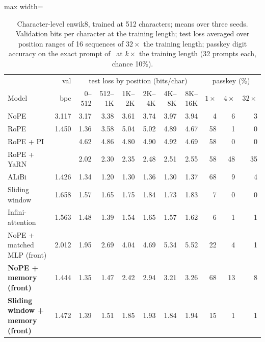 \begin{table}\centering\small
\setlength{\tabcolsep}{3.5pt}
\begin{adjustbox}{max width=\linewidth}
\begin{tabular}{l r rrrrrr rrr}
\toprule
 & val & \multicolumn{6}{c}{test loss by position (bits/char)} & \multicolumn{3}{c}{passkey (\%)} \\
Model & bpc & 0--512 & 512--1K & 1K--2K & 2K--4K & 4K--8K & 8K--16K & $1\times$ & $4\times$ & $32\times$ \\
\midrule
NoPE & 3.117 & 3.17 & 3.38 & 3.61 & 3.74 & 3.97 & 3.94 & 4 & 6 & 3 \\
RoPE & 1.450 & 1.36 & 3.58 & 5.04 & 5.02 & 4.89 & 4.67 & 58 & 1 & 0 \\
RoPE + PI &  & 4.62 & 4.86 & 4.80 & 4.90 & 4.92 & 4.69 & 58 & 0 & 0 \\
RoPE + YaRN &  & 2.02 & 2.30 & 2.35 & 2.48 & 2.51 & 2.55 & 58 & 48 & 35 \\
ALiBi & 1.426 & 1.34 & 1.20 & 1.30 & 1.36 & 1.30 & 1.37 & 68 & 9 & 4 \\
Sliding window & 1.658 & 1.57 & 1.65 & 1.75 & 1.84 & 1.73 & 1.83 & 7 & 0 & 0 \\
Infini-attention & 1.563 & 1.48 & 1.39 & 1.54 & 1.65 & 1.57 & 1.62 & 6 & 1 & 1 \\
NoPE + matched MLP (front) & 2.012 & 1.95 & 2.69 & 4.04 & 4.69 & 5.34 & 5.52 & 22 & 4 & 1 \\
\textbf{NoPE + memory (front)} & 1.444 & 1.35 & 1.47 & 2.42 & 2.94 & 3.21 & 3.26 & 68 & 13 & 8 \\
\textbf{Sliding window + memory (front)} & 1.472 & 1.39 & 1.51 & 1.85 & 1.93 & 1.84 & 1.94 & 15 & 1 & 1 \\
\bottomrule
\end{tabular}
\end{adjustbox}
\caption{Character-level enwik8, trained at 512 characters; means over three seeds. Validation bits per character at the training length; test loss averaged over position ranges of 16 sequences of $32\times$ the training length; passkey digit accuracy on the exact prompt of~\citet{mohtashami2023landmark} at $k\times$ the training length (32 prompts each, chance 10\%).}
\label{tab:lm}
\end{table}
